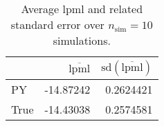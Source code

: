 \begin{table}[H]

\caption{Average lpml and related standard error over $n_{\text{sim}} = 10$ simulations.}
\centering
\begin{tabular}[t]{lrr}
\toprule
  & $\overbar{\text{lpml}}$ & $\text{sd}(\overbar{\text{lpml}})$\\
\midrule
PY & -14.87242 & 0.2624421\\
True & -14.43038 & 0.2574581\\
\bottomrule
\end{tabular}
\end{table}